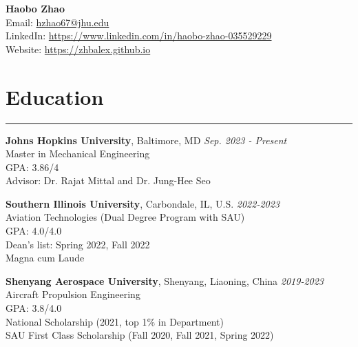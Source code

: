 \documentclass[11pt]{article}
\begin{document}

\begin{center}
    {\LARGE \textbf{Haobo Zhao}} \\
    \vspace{2mm}
    \small
    Email: \href{mailto:hzhao67@jhu.edu}{hzhao67@jhu.edu} \\
    \vspace{1mm}
    LinkedIn: \href{https://www.linkedin.com/in/haobo-zhao-035529229}{https://www.linkedin.com/in/haobo-zhao-035529229} \\
    \vspace{1mm}
    Website: \href{https://zhbalex.github.io}{https://zhbalex.github.io} \\
\end{center}

\vspace{6mm}

\section*{Education}
\hrule

\noindent\textbf{Johns Hopkins University}, Baltimore, MD \hfill \textit{Sep. 2023 - Present} \\
Master in Mechanical Engineering \\
GPA: 3.86/4 \\
Advisor: Dr. Rajat Mittal and Dr. Jung-Hee Seo

\vspace{2mm}

\noindent\textbf{Southern Illinois University}, Carbondale, IL, U.S. \hfill \textit{2022-2023} \\
Aviation Technologies (Dual Degree Program with SAU) \\
GPA: 4.0/4.0\\
Dean's list: Spring 2022, Fall 2022\\
Magna cum Laude


\vspace{2mm}

\noindent\textbf{Shenyang Aerospace University}, Shenyang, Liaoning, China \hfill \textit{2019-2023} \\
Aircraft Propulsion Engineering \\
GPA: 3.8/4.0 \\
National Scholarship (2021, top 1\% in Department) \\
SAU First Class Scholarship (Fall 2020, Fall 2021, Spring 2022)
\end{document}
